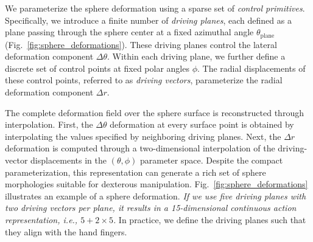 We parameterize the sphere deformation using a sparse set of \emph{control primitives}. Specifically, we introduce a finite number of \emph{driving planes}, each defined as a plane passing through the sphere center at a fixed azimuthal angle $\theta_{\text{plane}}$ (Fig.~\ref{fig:sphere_deformations}). These driving planes control the lateral deformation component $\Delta\theta$. Within each driving plane, we further define a discrete set of control points at fixed polar angles $\phi$. The radial displacements of these control points, referred to as \emph{driving vectors}, parameterize the radial deformation component $\Delta r$.

The complete deformation field over the sphere surface is reconstructed through interpolation. First, the $\Delta\theta$ deformation at every surface point is obtained by interpolating the values specified by neighboring driving planes. Next, the $\Delta r$ deformation is computed through a two-dimensional interpolation of the driving-vector displacements in the $(\theta,\phi)$ parameter space. Despite the compact parameterization, this representation can generate a rich set of sphere morphologies suitable for dexterous manipulation. Fig.~\ref{fig:sphere_deformations} illustrates an example of a sphere deformation. \emph{If we use five driving planes with two driving vectors per plane, it results in a 15-dimensional continuous action representation, i.e., $5 + 2 \times 5$.} In practice, we define the driving planes such that they align with the hand fingers.





